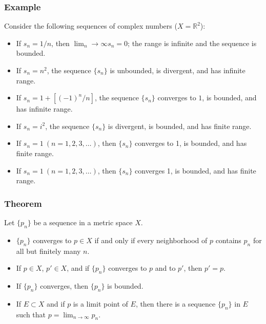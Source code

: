 \documentclass{beamer}
\begin{document}
\begin{frame}
    \frametitle{Example}

    Consider the following sequences of complex numbers (\(X = \mathbb{R}^2\)): \pause
    \begin{itemize}
        \item If \(s_n=1/n\), then \(\lim_n \to \infty s_n =0\); the range is infinite and the sequence is bounded. \pause
        \item If \(s_n=n^2\), the sequence \(\{s_n\}\) is unbounded, is divergent, and has infinite range. \pause
        \item If \(s_n= 1+ [(-1)^n/n]\), the sequence \(\{s_n\}\) converges to \(1\), is bounded, and has infinite range. \pause  
        \item If \(s_n = i^2\), the sequence \(\{s_n\}\) is divergent, is bounded, and has finite range. \pause
        \item If \(s_n = 1~(n=1,2,3, \dots)\), then \(\{s_n\}\) converges to 1, is bounded, and has finite range. \pause
        \item If \(s_n =1 ~(n=1,2,3, \dots)\), then \(\{s_n\}\) converges 1, is bounded, and has finite range. 
    \end{itemize}

\end{frame}

\begin{frame}
    \frametitle{Theorem}

    Let \(\{p_n\}\) be a sequence in a metric space \(X\). 

    \begin{itemize}
        \item \(\{p_n\}\) converges to \(p \in X\) if and only if every neighborhood of \(p\) contains \(p_n\) for all but finitely many \(n\). \pause
        \item If \(p \in X\), \(p' \in X\), and if \(\{p_n\}\) converges to \(p\) and to \(p'\), then \(p'=p\).\pause
        \item If \(\{p_n\}\) converges, then \(\{p_n\}\) is bounded. \pause
        \item If \(E \subset X \) and if \(p\) is a limit point of \(E\), then there is a sequence \(\{p_n\}\) in \(E\) such that \(p = \lim_{n \to \infty}p_n\). 
    \end{itemize}

\end{frame}
\end{document}
